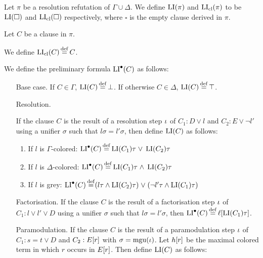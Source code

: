\documentclass[,%
	draft=false,%
	numbers=noendperiod
	11pt,
	a4paper,
	oneside,%
	openany,
]{memoir}
\begin{document}
\begin{defi}
	Let $\pi$ be a resolution refutation of $\Gamma \cup \Delta$.
	We define $\operatorname{LI}(\pi)$ and $\operatorname{LI}_{\operatorname{cl}}(\pi)$ to be $\operatorname{LI}(\square)$ and $\operatorname{LI}_{\operatorname{cl}}(\square)$ respectively, where $\square$ is the empty clause derived in $\pi$.

	Let $C$ be a clause in $\pi$. 

	We define $\operatorname{LI}_{\operatorname{cl}}(C) \operatorname{\stackrel{\mathrm{def}}{=}} C$. 

	We define the preliminary formula $\operatorname{LI}^\bullet(C)$ as follows:

	\begin{itemize}
		\item[Base case.]
			If $C \in \Gamma$, $\operatorname{LI}(C) \operatorname{\stackrel{\mathrm{def}}{=}} \bot$.
			If otherwise $C \in \Delta$, $\operatorname{LI}(C) \operatorname{\stackrel{\mathrm{def}}{=}} \top$.
		\item[Resolution.]

			If the clause $C$ is the result of a resolution step $\iota$ of $C_1: D \lor l$ and $C_2: E \lor \lnot l'$ using a unifier $\sigma$ such that $l\sigma =  l'\sigma$, then define $\operatorname{LI}(C)$ as follows:

			\begin{enumerate}

				\item If $l$ is $\Gamma$-colored:
					$\operatorname{LI}^\bullet(C) \operatorname{\stackrel{\mathrm{def}}{=}} \operatorname{LI}(C_1)\tau\;{\lor}\; \operatorname{LI}(C_2)\tau $

				\item If $l$ is $\Delta$-colored:
					$\operatorname{LI}^\bullet(C) \operatorname{\stackrel{\mathrm{def}}{=}} \operatorname{LI}(C_1)\tau\;{\land}\; \operatorname{LI}(C_2)\tau$

				\item If $l$ is grey:
					$\operatorname{LI}^\bullet(C) \operatorname{\stackrel{\mathrm{def}}{=}}
					(l\tau \land \operatorname{LI}(C_2)\tau) \;{\lor}\;
					(\lnot l'\tau\land \operatorname{LI}(C_1)\tau)
					$

			\end{enumerate}

		\item[Factorisation.]
			If the clause $C$ is the result of a factorisation step $\iota$ of $C_1: l \lor l' \lor D$ using a unifier $\sigma$ such that $l\sigma = l'\sigma$, then $\operatorname{LI}^\bullet(C) \operatorname{\stackrel{\mathrm{def}}{=}} \ell[\operatorname{LI}(C_1)\tau]$.

		\item[Paramodulation.]
			If the clause $C$ is the result of a paramodulation step $\iota$ of $C_1 : s = t \lor D$ and $C_2: E[r]$ with $\sigma = \operatorname{mgu}(\iota)$.
			Let $h[r]$ be the maximal colored term in which $r$ occurs in $E[r]$.
			Then define $\operatorname{LI}(C)$ as follows:


\end{itemize}
\end{defi}
\end{document}
